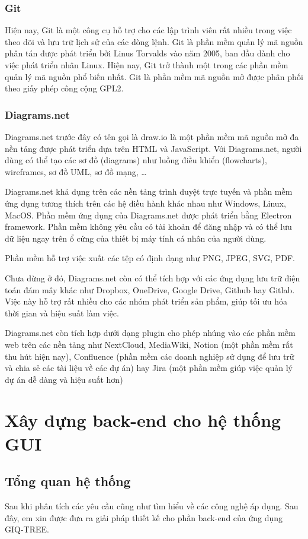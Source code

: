 \documentclass[12pt]{report}
\begin{document}
\subsection{Git}
Hiện nay, Git là một công cụ hỗ trợ cho các lập trình viên rất nhiều trong việc theo dõi và lưu trữ lịch sử của các dòng lệnh. Git là phần mềm quản lý mã nguồn phân tán được phát triển bởi Linus Torvalds vào năm 2005, ban đầu dành cho việc phát triển nhân Linux. Hiện nay, Git trở thành một trong các phần mềm quản lý mã nguồn phổ biến nhất. Git là phần mềm mã nguồn mở được phân phối theo giấy phép công cộng GPL2.
\subsection{Diagrams.net}
Diagrams.net trước đây có tên gọi là draw.io là một phần mềm mã nguồn mở đa nền tảng được phát triển dựa trên HTML và JavaScript. Với Diagrams.net, người dùng có thể tạo các sơ đồ (diagrams) như luồng điều khiển (flowcharts), wireframes, sơ đồ UML, sơ đồ mạng, …

Diagrams.net khả dụng trên các nền tảng trình duyệt trực tuyến và phần mềm ứng dụng tương thích trên các hệ điều hành khác nhau như Windows, Linux, MacOS. Phần mềm ứng dụng của Diagrams.net được phát triển bằng Electron framework. Phần mềm không yêu cầu có tài khoản để đăng nhập và có thể lưu dữ liệu ngay trên ổ cứng của thiết bị máy tính cá nhân của người dùng.

Phần mềm hỗ trợ việc xuất các tệp có định dạng như PNG, JPEG, SVG, PDF.

Chưa dừng ở đó, Diagrams.net còn có thể tích hợp với các ứng dụng lưu trữ điện toán đám mây khác như Dropbox, OneDrive, Google Drive, Github hay Gitlab. Việc này hỗ trợ rất nhiều cho các nhóm phát triển sản phẩm, giúp tối ưu hóa thời gian và hiệu suất làm việc.

Diagrams.net còn tích hợp dưới dạng plugin cho phép nhúng vào các phần mềm web trên các nền tảng như NextCloud, MediaWiki, Notion (một phần mềm rất thu hút hiện nay), Confluence (phần mềm các doanh nghiệp sử dụng để lưu trữ và chia sẻ các tài liệu về các dự án) hay Jira (một phần mềm giúp việc quản lý dự án dễ dàng và hiệu suất hơn)

\newpage	
\chapter{Xây dựng back-end cho hệ thống GUI}
\label{chap:chapter4}
\section{Tổng quan hệ thống}
Sau khi phân tích các yêu cầu cũng như tìm hiểu về các công nghệ áp dụng. Sau đây, em xin được đưa ra giải pháp thiết kế cho phần back-end của ứng dụng GIQ-TREE.
\end{document}
